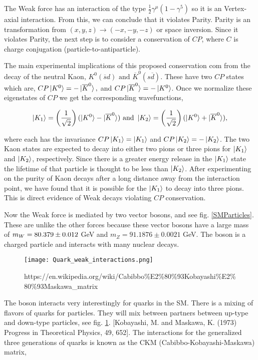 The Weak force has an interaction of the type $\frac{1}{2}\gamma^\mu(1-\gamma^5)$ so it is an Vertex-axial interaction. From this, we can conclude that it violates Parity. Parity is an transformation from $(x, y, z)\rightarrow(-x,-y,-z)$ or space inversion. Since it violates Parity, the next step is to consider a conservation of $CP$, where $C$ is charge conjugation (particle-to-antiparticle). 

The main experimental implications of this proposed conservation com from the decay of the neutral Kaon, $K^0(\overline{s}d) \text{ and } \overline{K}^0(s\overline{d})$. These have two $CP$ states which are, $CP\ket{K^0}=-\ket{\overline{K}^0},$ and $CP\ket{\overline{K}^0}=-\ket{K^0}$. Once we normalize these eigenstates of $CP$ we get the corresponding wavefunctions,

\begin{equation*}\label{KaonEigenstate}
\ket{K_1}=\left(\frac{1}{\sqrt{2}}\right)(\ket{K^0}-\ket{\overline{K}^0}) \text{ and } \ket{K_2}=\left(\frac{1}{\sqrt{2}}\right)(\ket{K^0}+\ket{\overline{K}^0}),
\end{equation*}

where each has the invariance $CP\ket{K_1}=\ket{K_1}$ and $CP\ket{K_2}=-\ket{K_2}$. The two Kaon states are expected to decay into either two pions or three pions for $\ket{K_1}$ and $\ket{K_2}$, respectively. Since there is a greater energy release in the $\ket{K_1}$ state the lifetime of that particle is thought to be less than $\ket{K_2}$. After experimenting on the purity of Kaon decays after a long distance away from the interaction point, we have found that it is possible for the $\ket{K_1}$ to decay into three pions. This is direct evidence of Weak decays violating $CP$ conservation. 

Now the Weak force is mediated by two vector bosons, \W and \Z see fig. \ref{SMParticles}. These are unlike the other forces because these vector bosons have a large mass of $m_{W}=80.379\pm0.012$ GeV and $m_Z=91.1876\pm0.0021$ GeV. The \W boson is a charged particle and interacts with many nuclear decays. 

\begin{figure}
 	\centering
	\texttt{[image: Quark\_weak\_interactions.png]}
 	\caption{https://en.wikipedia.org/wiki/Cabibbo\%E2\%80\%93Kobayashi\%E2\%80\%93Maskawa\_matrix}
 	\label{CKMInteractions} 
\end{figure}

The \W boson interacts very interestingly for quarks in the SM. There is a mixing of flavors of quarks for particles. They will mix between partners between up-type and down-type particles, see fig. \ref{CKMInteractions}. [Kobayashi, M. and Maskawa, K. (1973) Progress in Theoretical Physics, 49, 652]. The interactions for the generalized three generations of quarks is known as the CKM (Cabibbo-Kobayashi-Maskawa) matrix,

